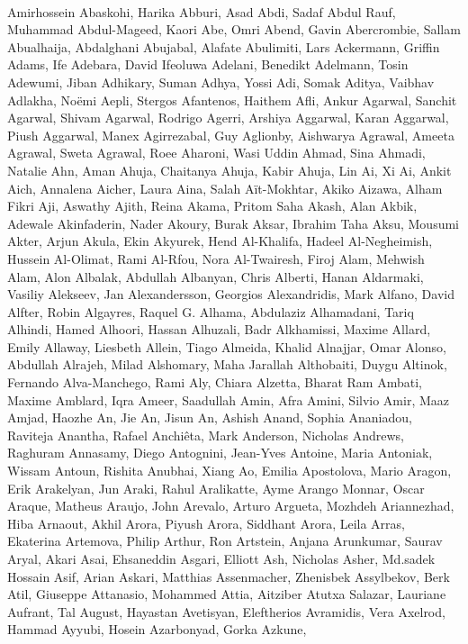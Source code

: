 \paragraph{}Amirhossein Abaskohi, Harika Abburi, Asad Abdi, Sadaf Abdul Rauf, Muhammad Abdul-Mageed, Kaori Abe, Omri Abend, Gavin Abercrombie, Sallam Abualhaija, Abdalghani Abujabal, Alafate Abulimiti, Lars Ackermann, Griffin Adams, Ife Adebara, David Ifeoluwa Adelani, Benedikt Adelmann, Tosin Adewumi, Jiban Adhikary, Suman Adhya, Yossi Adi, Somak Aditya, Vaibhav Adlakha, Noëmi Aepli, Stergos Afantenos, Haithem Afli, Ankur Agarwal, Sanchit Agarwal, Shivam Agarwal, Rodrigo Agerri, Arshiya Aggarwal, Karan Aggarwal, Piush Aggarwal, Manex Agirrezabal, Guy Aglionby, Aishwarya Agrawal, Ameeta Agrawal, Sweta Agrawal, Roee Aharoni, Wasi Uddin Ahmad, Sina Ahmadi, Natalie Ahn, Aman Ahuja, Chaitanya Ahuja, Kabir Ahuja, Lin Ai, Xi Ai, Ankit Aich, Annalena Aicher, Laura Aina, Salah Aït-Mokhtar, Akiko Aizawa, Alham Fikri Aji, Aswathy Ajith, Reina Akama, Pritom Saha Akash, Alan Akbik, Adewale Akinfaderin, Nader Akoury, Burak Aksar, Ibrahim Taha Aksu, Mousumi Akter, Arjun Akula, Ekin Akyurek, Hend Al-Khalifa, Hadeel Al-Negheimish, Hussein Al-Olimat, Rami Al-Rfou, Nora Al-Twairesh, Firoj Alam, Mehwish Alam, Alon Albalak, Abdullah Albanyan, Chris Alberti, Hanan Aldarmaki, Vasiliy Alekseev, Jan Alexandersson, Georgios Alexandridis, Mark Alfano, David Alfter, Robin Algayres, Raquel G. Alhama, Abdulaziz Alhamadani, Tariq Alhindi, Hamed Alhoori, Hassan Alhuzali, Badr Alkhamissi, Maxime Allard, Emily Allaway, Liesbeth Allein, Tiago Almeida, Khalid Alnajjar, Omar Alonso, Abdullah Alrajeh, Milad Alshomary, Maha Jarallah Althobaiti, Duygu Altinok, Fernando Alva-Manchego, Rami Aly, Chiara Alzetta, Bharat Ram Ambati, Maxime Amblard, Iqra Ameer, Saadullah Amin, Afra Amini, Silvio Amir, Maaz Amjad, Haozhe An, Jie An, Jisun An, Ashish Anand, Sophia Ananiadou, Raviteja Anantha, Rafael Anchiêta, Mark Anderson, Nicholas Andrews, Raghuram Annasamy, Diego Antognini, Jean-Yves Antoine, Maria Antoniak, Wissam Antoun, Rishita Anubhai, Xiang Ao, Emilia Apostolova, Mario Aragon, Erik Arakelyan, Jun Araki, Rahul Aralikatte, Ayme Arango Monnar, Oscar Araque, Matheus Araujo, John Arevalo, Arturo Argueta, Mozhdeh Ariannezhad, Hiba Arnaout, Akhil Arora, Piyush Arora, Siddhant Arora, Leila Arras, Ekaterina Artemova, Philip Arthur, Ron Artstein, Anjana Arunkumar, Saurav Aryal, Akari Asai, Ehsaneddin Asgari, Elliott Ash, Nicholas Asher, Md.sadek Hossain Asif, Arian Askari, Matthias Assenmacher, Zhenisbek Assylbekov, Berk Atil, Giuseppe Attanasio, Mohammed Attia, Aitziber Atutxa Salazar, Lauriane Aufrant, Tal August, Hayastan Avetisyan, Eleftherios Avramidis, Vera Axelrod, Hammad Ayyubi, Hosein Azarbonyad, Gorka Azkune,
